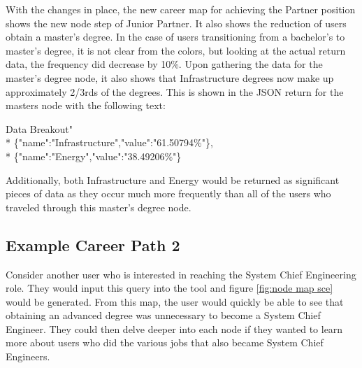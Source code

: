 With the changes in place, the new career map for achieving the Partner
position shows the new node step of Junior Partner.  It also shows the reduction
of users obtain a master's degree.  In the case of users transitioning from a
bachelor's to master's degree, it is not clear from the colors, but looking at
the actual return data, the frequency did decrease by 10\%.  Upon gathering the
data for the master's degree node, it also shows that Infrastructure degrees now
make up approximately 2/3rds of the degrees.  This is shown in the JSON
return for the masters node with the following text:

\begin{tt}
\begin{footnotesize}
\indent Data Breakout"\\*
\indent \indent \indent \{"name":"Infrastructure","value":"61.50794\%"\},\\*
\indent \indent \indent \{"name":"Energy","value":"38.49206\%"\}
\end{footnotesize}
\end{tt}

\noindent Additionally, both Infrastructure and Energy would be returned as
significant pieces of data as they occur much more frequently than all of the
users who traveled through this master's degree node.

\subsection{Example Career Path 2 }
Consider another user who is interested in reaching the System Chief Engineering
role.  They would input this query into the tool and figure \ref{fig:node map
sce} would be generated.  From this map, the user would quickly be able to see
that obtaining an advanced degree was unnecessary to become a System Chief
Engineer.  They could then delve deeper into each node if they wanted to learn
more about users who did the various jobs that also became System Chief
Engineers.


\usetikzlibrary{shapes,arrows,chains}

